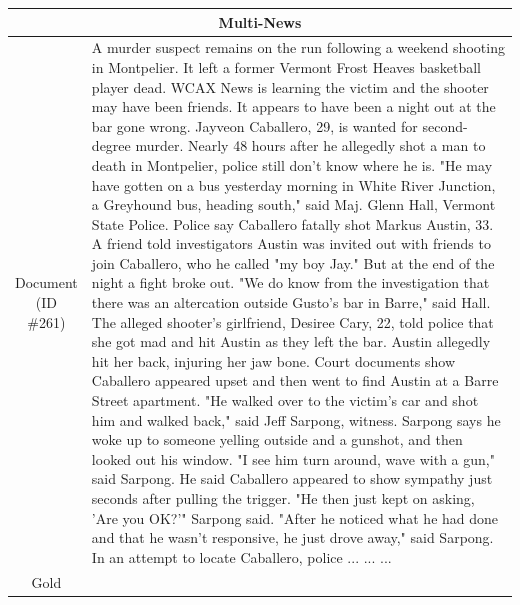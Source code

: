 \begin{table}[bth!]
\scriptsize
\centering
\renewcommand{\arraystretch}{1.3}
\begin{tabular}{c|p{}}
\hline
\multicolumn{2}{c}{Multi-News} \\ \hline
\makecell{Document\\(ID \#261)} & 
A murder suspect remains on the run following a weekend shooting in Montpelier. It left a former Vermont Frost Heaves basketball player dead. WCAX News is learning the victim and the shooter may have been friends. It appears to have been a night out at the bar gone wrong. Jayveon Caballero, 29, is wanted for second-degree murder. Nearly 48 hours after he allegedly shot a man to death in Montpelier, police still don't know where he is. "He may have gotten on a bus yesterday morning in White River Junction, a Greyhound bus, heading south," said Maj. Glenn Hall, Vermont State Police. Police say Caballero fatally shot Markus Austin, 33. A friend told investigators Austin was invited out with friends to join Caballero, who he called "my boy Jay." But at the end of the night a fight broke out. "We do know from the investigation that there was an altercation outside Gusto's bar in Barre," said Hall. The alleged shooter's girlfriend, Desiree Cary, 22, told police that she got mad and hit Austin as they left the bar. Austin allegedly hit her back, injuring her jaw bone. Court documents show Caballero appeared upset and then went to find Austin at a Barre Street apartment. "He walked over to the victim's car and shot him and walked back," said Jeff Sarpong, witness. Sarpong says he woke up to someone yelling outside and a gunshot, and then looked out his window. "I see him turn around, wave with a gun," said Sarpong. He said Caballero appeared to show sympathy just seconds after pulling the trigger. "He then just kept on asking, 'Are you OK?'" Sarpong said. "After he noticed what he had done and that he wasn't responsive, he just drove away," said Sarpong. In an attempt to locate Caballero, police ... ... ... 
\\ \hline
Gold & 

\end{tabular}
\end{table}
